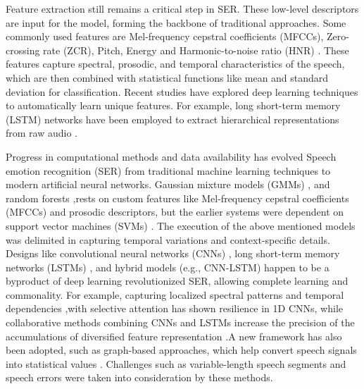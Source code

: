 \documentclass[iicol,sn-mathphys-num]{sn-jnl}%
\theoremstyle{thmstyleone}%
\theoremstyle{thmstyletwo}%
\theoremstyle{thmstylethree}%
\begin{document}
Feature extraction still remains a critical step in SER. These low-level descriptors are input for the model, forming the backbone of traditional approaches. Some commonly used features are Mel-frequency cepstral coefficients (MFCCs), Zero-crossing rate (ZCR), Pitch, Energy and Harmonic-to-noise ratio (HNR) \cite{r5}. These features capture spectral, prosodic, and temporal characteristics of the speech, which are then combined with statistical functions like mean and standard deviation for classification. Recent studies have explored deep learning techniques to automatically learn unique features. For example, long short-term memory (LSTM) networks have been employed to extract hierarchical representations from raw audio \cite{r3}.


Progress in computational methods and data availability has evolved Speech emotion recognition (SER) from traditional machine learning techniques to modern artificial neural networks. Gaussian mixture models (GMMs) \cite{r1}, and random forests \cite{r4},rests on custom features like Mel-frequency cepstral coefficients (MFCCs) and prosodic descriptors, but the earlier systems were dependent on support vector machines (SVMs) \cite{r5}. The execution of the above mentioned models was delimited in capturing temporal variations and context-specific details. Designs like convolutional neural networks (CNNs) \cite{r3}, long short-term memory networks (LSTMs) \cite{r7}, and hybrid models (e.g., CNN-LSTM) \cite{r6} happen to be a byproduct of deep learning revolutionized SER, allowing complete learning and commonality. For example, capturing localized spectral patterns and temporal dependencies \cite{r6},with selective attention has shown resilience in 1D CNNs, while collaborative methods combining CNNs and LSTMs increase the precision of the accumulations  of diversified feature representation \cite{r9}.A new framework has also been adopted, such as graph-based approaches, which help convert speech signals into statistical values \cite{r4}. Challenges such as variable-length speech segments and speech errors were taken into consideration by these methods.
\end{document}

